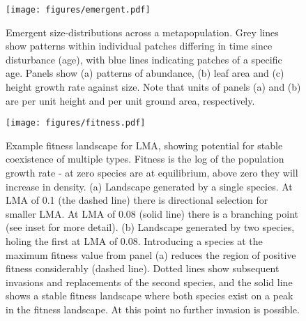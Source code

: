\documentclass[a4paper,11pt]{article}
\begin{document}
\newpage

\begin{figure}[h!]
\centering
\texttt{[image: figures/emergent.pdf]}
\caption{Emergent size-distributions across a metapopulation.
Grey lines show patterns within individual patches differing in time since disturbance (age), with blue lines indicating patches of a specific age. Panels show (a) patterns of abundance, (b) leaf area and (c) height growth rate against size. Note that units of panels (a) and (b) are per unit height and per unit ground area, respectively.}
\label{fig:emergent}
\end{figure}

\newpage

\begin{figure}[h!]
\centering
\texttt{[image: figures/fitness.pdf]}
\caption{Example fitness landscape for LMA, showing potential for stable
coexistence of multiple types.  Fitness is the log of the population growth
rate - at zero species are at equilibrium, above zero they will increase in
density.  (a) Landscape generated by a single species.  At LMA of 0.1 (the
dashed line) there is directional selection for smaller LMA.  At LMA of 0.08
(solid line) there is a branching point (see inset for more detail).  (b)
Landscape generated by two species, holing the first at LMA of 0.08.
Introducing a species at the maximum fitness value from panel (a) reduces the
region of positive fitness considerably (dashed line).  Dotted lines show
subsequent invasions and replacements of the second species, and the solid
line shows a stable fitness landscape where both species exist on a peak in
the fitness landscape.  At this point no further invasion is possible.}
\label{fig:fitness}
\end{figure}

\clearpage
\end{document}
